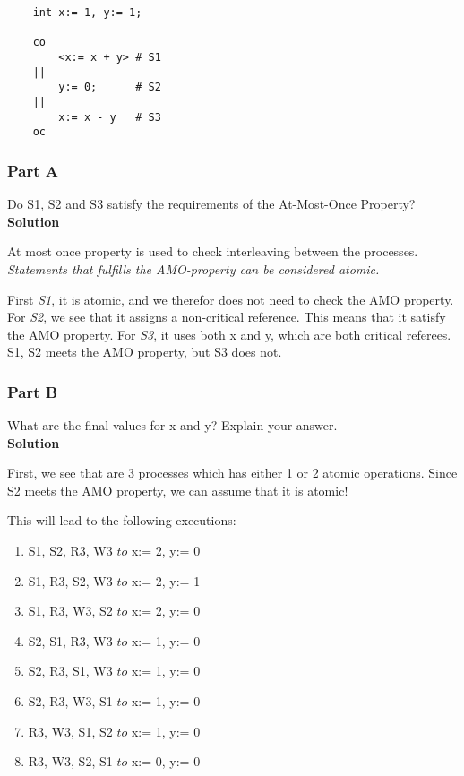 \begin{lstlisting}
    int x:= 1, y:= 1;

    co 
        <x:= x + y> # S1
    ||
        y:= 0;      # S2
    ||
        x:= x - y   # S3
    oc
\end{lstlisting}


\subsubsection{Part A}

Do S1, S2 and S3 satisfy the requirements of the At-Most-Once Property? \\

\textbf{Solution} 

At most once property is used to check interleaving between the processes. 
\textit{Statements that fulfills the AMO-property can be considered atomic.} 


First \textit{S1}, it is atomic, and we therefor does not need to check the AMO property. 
For \textit{S2}, we see that it assigns a non-critical reference. This means that it satisfy the AMO property.
For \textit{S3}, it uses both x and y, which are both critical referees.
S1, S2 meets the AMO property, but S3 does not. 

\subsubsection{Part B}

What are the final values for x and y? Explain your answer. \\

\textbf{Solution} 

First, we see that are 3 processes which has either 1 or 2 atomic operations. 
Since S2 meets the AMO property, we can assume that it is atomic!

This will lead to the following executions:

\begin{enumerate}
    \item S1, S2, R3, W3 $to$ x:= 2, y:= 0
    \item S1, R3, S2, W3 $to$ x:= 2, y:= 1
    \item S1, R3, W3, S2 $to$ x:= 2, y:= 0
    \item S2, S1, R3, W3 $to$ x:= 1, y:= 0
    \item S2, R3, S1, W3 $to$ x:= 1, y:= 0
    \item S2, R3, W3, S1 $to$ x:= 1, y:= 0
    \item R3, W3, S1, S2 $to$ x:= 1, y:= 0
    \item R3, W3, S2, S1 $to$ x:= 0, y:= 0
\end{enumerate}


